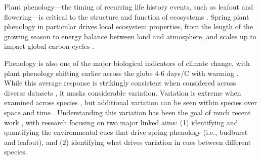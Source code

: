 \documentclass[11pt]{article}
\begin{document}

\newpage
\linenumbers

Plant phenology---the timing of recurring life history events, such as leafout and flowering---is critical to the structure and function of ecosystems \citep{Cleland:2007aa}. Spring plant phenology in particular drives local ecosystem properties, from the length of the growing season to energy balance between land and atmosphere, and scales up to impact global carbon cycles \citep{Richardson:2009aa}. %

Phenology is also one of the major biological indicators of climate change, with plant phenology shifting earlier across the globe 4-6 days/\degree C with warming \citep{IPCC:2014sm}. While this average response is strikingly consistent when considered across diverse datasets \citep{Wolkovich:2012aa}, it masks considerable variation. Variation is extreme when examined across species \citep{Wolkovich:2014ab}, but additional variation can be seen within species over space \citep{vitasselev,kramer2017} and time \citep{yu2010,fu2015}. Understanding this variation has been the goal of much recent work \citep{Rutishauser:2008fu,Laube2015,donnelly2017,zohner2017}, with research focusing on two major linked aims: (1) identifying and quantifying the environmental cues that drive spring phenology (i.e., budburst and leafout), and (2) identifying what drives variation in cues between different species.
\end{document}
